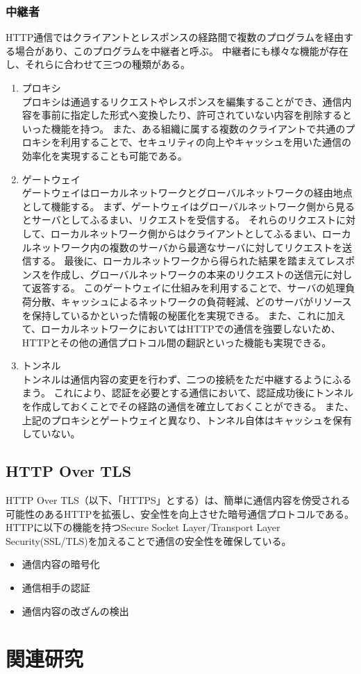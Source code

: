 \documentclass[12pt,a4paper]{jbook}
\begin{document}
\subsubsection{中継者}
\label{sec:intermediary}
HTTP通信ではクライアントとレスポンスの経路間で複数のプログラムを経由する場合があり、このプログラムを中継者と呼ぶ。
中継者にも様々な機能が存在し、それらに合わせて三つの種類がある。
\begin{enumerate}
\item プロキシ\\
プロキシは通過するリクエストやレスポンスを編集することができ、通信内容を事前に指定した形式へ変換したり、許可されていない内容を削除するといった機能を持つ。
また、ある組織に属する複数のクライアントで共通のプロキシを利用することで、セキュリティの向上やキャッシュを用いた通信の効率化を実現することも可能である。
\item ゲートウェイ\\
ゲートウェイはローカルネットワークとグローバルネットワークの経由地点として機能する。
まず、ゲートウェイはグローバルネットワーク側から見るとサーバとしてふるまい、リクエストを受信する。
それらのリクエストに対して、ローカルネットワーク側からはクライアントとしてふるまい、ローカルネットワーク内の複数のサーバから最適なサーバに対してリクエストを送信する。
最後に、ローカルネットワークから得られた結果を踏まえてレスポンスを作成し、グローバルネットワークの本来のリクエストの送信元に対して返答する。
このゲートウェイに仕組みを利用することで、サーバの処理負荷分散、キャッシュによるネットワークの負荷軽減、どのサーバがリソースを保持しているかといった情報の秘匿化を実現できる。
また、これに加えて、ローカルネットワークにおいてはHTTPでの通信を強要しないため、HTTPとその他の通信プロトコル間の翻訳といった機能も実現できる。
\item トンネル\\
トンネルは通信内容の変更を行わず、二つの接続をただ中継するようにふるまう。
これにより、認証を必要とする通信において、認証成功後にトンネルを作成しておくことでその経路の通信を確立しておくことができる。
また、上記のプロキシとゲートウェイと異なり、トンネル自体はキャッシュを保有していない。
\end{enumerate}

\subsection{HTTP Over TLS}
\label{sec:https}
HTTP Over TLS\cite{https}（以下、「HTTPS」とする）は、簡単に通信内容を傍受される可能性のあるHTTPを拡張し、安全性を向上させた暗号通信プロトコルである。
HTTPに以下の機能を持つSecure Socket Layer/Transport Layer Security(SSL/TLS)を加えることで通信の安全性を確保している。
\begin{itemize}
\item 通信内容の暗号化
\item 通信相手の認証
\item 通信内容の改ざんの検出
\end{itemize}

\section{関連研究}
\end{document}

